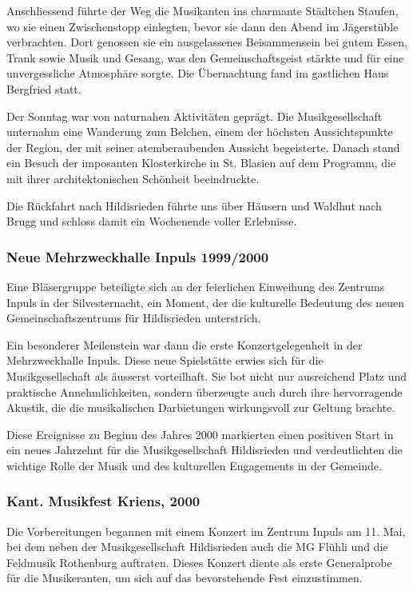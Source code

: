 \begin{history}
    Anschliessend führte der Weg die Musikanten ins charmante Städtchen Staufen,
    wo sie einen Zwischenstopp einlegten, bevor sie dann den Abend im
    Jägerstüble verbrachten. Dort genossen sie ein ausgelassenes Beisammensein
    bei gutem Essen, Trank sowie Musik und Gesang, was den Gemeinschaftsgeist
    stärkte und für eine unvergessliche Atmosphäre sorgte. Die Übernachtung fand
    im gastlichen Haus Bergfried statt.

    Der Sonntag war von naturnahen Aktivitäten geprägt. Die Musikgesellschaft
    unternahm eine Wanderung zum Belchen, einem der höchsten Aussichtspunkte der
    Region, der mit seiner atemberaubenden Aussicht begeisterte. Danach stand
    ein Besuch der imposanten Klosterkirche in St. Blasien auf dem Programm, die
    mit ihrer architektonischen Schönheit beeindruckte.

    Die Rückfahrt nach Hildisrieden führte uns über Häusern und Waldhut nach
    Brugg und schloss damit ein Wochenende voller Erlebnisse.

    \subsubsection{Neue Mehrzweckhalle Inpuls 1999/2000}

    Eine Bläsergruppe beteiligte sich an der feierlichen Einweihung des Zentrums
    Inpuls in der Silvesternacht, ein Moment, der die kulturelle Bedeutung des
    neuen Gemeinschaftszentrums für Hildisrieden unterstrich.

    Ein besonderer Meilenstein war dann die erste Konzertgelegenheit in der
    Mehrzweckhalle Inpuls. Diese neue Spielstätte erwies sich für die
    Musikgesellschaft als äusserst vorteilhaft. Sie bot nicht nur ausreichend
    Platz und praktische Annehmlichkeiten, sondern überzeugte auch durch ihre
    hervorragende Akustik, die die musikalischen Darbietungen wirkungsvoll zur
    Geltung brachte.

    Diese Ereignisse zu Beginn des Jahres 2000 markierten einen positiven Start
    in ein neues Jahrzehnt für die Musikgesellschaft Hildisrieden und
    verdeutlichten die wichtige Rolle der Musik und des kulturellen Engagements
    in der Gemeinde.

    \subsubsection*{Kant. Musikfest Kriens, 2000}

    Die Vorbereitungen begannen mit einem Konzert im Zentrum Inpuls am 11. Mai,
    bei dem neben der Musikgesellschaft Hildisrieden auch die MG Flühli und die
    Feldmusik Rothenburg auftraten. Dieses Konzert diente als erste Generalprobe
    für die Musikeranten, um sich auf das bevorstehende Fest einzustimmen.


\end{history}
